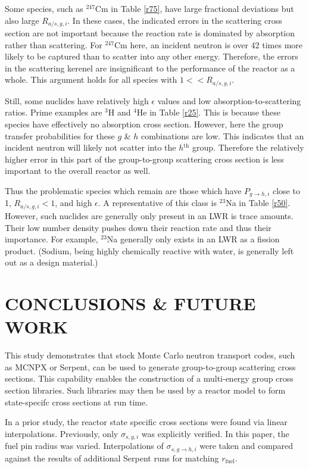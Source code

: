 \documentclass{physor2012}
\newcommand{\superscript}[1]{\ensuremath{^{\textrm{#1}}}}
\newcommand{\nuc}[2]{\superscript{#2}{#1}}
\begin{document}
Some species, such as \nuc{Cm}{247} in Table \ref{r75}, have large fractional deviations
but also large $R_{a/s,g,i}$.  In these cases, the indicated errors in the 
scattering cross section are not important because the reaction rate is dominated
by absorption rather than scattering.  For \nuc{Cm}{247} here, an incident neutron is
over 42 times more likely to be captured than to scatter into any other energy.  
Therefore, the errors in the scattering kerenel are insignificant to the performance
of the reactor as a whole.  This argument holds for all species with $1 << R_{a/s,g,i}$.

Still, some nuclides have relatively high $\epsilon$ values and 
low absorption-to-scattering ratios.  Prime examples are \nuc{H}{3} and \nuc{He}{4}
in Table \ref{r25}.  This is because these species have effectively no 
absorption cross section.  However, here the group transfer probabilities
for these $g$ \& $h$ combinations are low.  This indicates that an incident
neutron will likely not scatter into the $h$\superscript{th} group.  Therefore the 
relatively higher error in this part of the group-to-group scattering cross section 
is less important to the overall reactor as well.

Thus the problematic species which remain are those which have $P_{g\to h,i}$ close 
to 1, $R_{a/s,g,i} < 1$, and high $\epsilon$.  A representative of this class is
\nuc{Na}{23} in Table \ref{r50}.  However, such nuclides are generally only present
in an LWR is trace amounts.  Their low number density pushes down their reaction rate
and thus their importance.  For example, \nuc{Na}{23} generally only exists in an 
LWR as a fission product.  (Sodium, being highly chemically reactive with water, is
generally left out as a design material.)


\section{CONCLUSIONS \& FUTURE WORK}
\label{sec:conclusions}

This study demonstrates that stock Monte Carlo neutron transport codes,
such as MCNPX or Serpent, can be used to generate group-to-group scattering 
cross sections.  This capability enables the construction of a multi-energy
group cross section libraries.  Such libraries may then be used by a reactor 
model to form state-specifc cross sections at run time.  

In a prior study, the reactor state specific cross sections were found
via linear interpolations.  Previously, only $\sigma_{s,g,i}$ was 
explicitly verified.  In this paper, the fuel pin radius was varied.
Interpolations of $\sigma_{s,g\to h,i}$ were taken and compared against
the results of additional Serpent runs for matching $r_{\mbox{fuel}}$.
\end{document}
